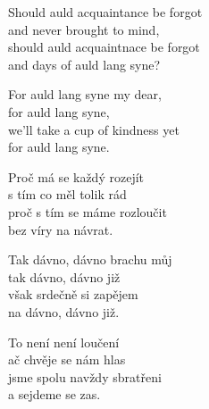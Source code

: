 
\ve{}
Should auld acquaintance be forgot\\
and never brought to mind,\\
should auld acquaintnace be forgot\\
and days of auld lang syne?

\cho{}
For auld lang syne my dear,\\
for auld lang syne,\\
we’ll take a cup of kindness yet\\
for auld lang syne.

\ve{}
Proč má se každý rozejít\\
s tím co měl tolik rád\\
proč s tím se máme rozloučit\\
bez víry na návrat.

\cho{}
Tak dávno, dávno brachu můj\\
tak dávno, dávno již\\
však srdečně si zapějem\\
na dávno, dávno již.

\ve{}
To není není loučení\\
ač chvěje se nám hlas\\
jsme spolu navždy sbratřeni\\
a sejdeme se zas.

\cho{}

\esong